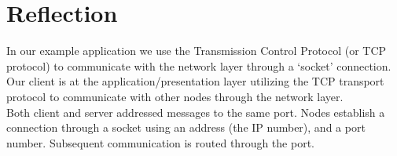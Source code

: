 \pagebreak

\section{Reflection}
\label{tcp_reflection}

\begin{comment}
In this exercise we worked with the TCP protocol. TCP is a transport layer level protocol. The TCP protocol provides communication between the application layer and the network layer (IP)\\

The TCP protocol is part of the TCP/IP protocol suite. A protocol suite is a stack of protocols each responsible for a single logical task, e.g. transport, packaging etc. Each layer communicates with the layer directly above and below, only. Messages are passed down the stack at one side and they bubble up through the stack at the other side. \\

At the bottom of the TCP/IP suite are the physical layer (hardware). On top of the physical layer the network layer provides an interface to the transport layer, application services (and their protocols) are built on top of the transport layer based on TCP e.g. HTTP, SMTP, POP, FTP etc. More layers can be added to provide additional functionality e.g. security etc.\\

Using protocols gives us network independance i.e., different application types and languages can use the same network to communicate 
as long as they comply to the same protocol(s). Note \textit{even so, the heterogeneity of distributed systems makes it difficult to provide guarantees.}\\
\end{comment}

In our example application we use the Transmission Control Protocol (or TCP protocol) to communicate with the network layer through a ‘socket’ connection. Our client is at the application/presentation layer utilizing the TCP transport protocol to communicate with other nodes through the network layer.\\

Both client and server addressed messages to the same port. Nodes establish a connection through a socket using an address (the IP number), and a port number. Subsequent communication is routed through the port. \\

